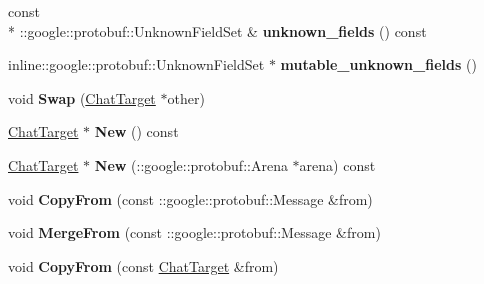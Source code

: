 \begin{DoxyCompactItemize}
\item 
\hypertarget{classSimpleChat_1_1ChatTarget_a8f89893fda6f9746dded787b9c65a7a5}{const \\*
\-::google\-::protobuf\-::\-Unknown\-Field\-Set \& {\bfseries unknown\-\_\-fields} () const }\label{classSimpleChat_1_1ChatTarget_a8f89893fda6f9746dded787b9c65a7a5}

\item 
\hypertarget{classSimpleChat_1_1ChatTarget_aab4226f6d671e5e4a008bd5e889aa322}{inline\-::google\-::protobuf\-::\-Unknown\-Field\-Set $\ast$ {\bfseries mutable\-\_\-unknown\-\_\-fields} ()}\label{classSimpleChat_1_1ChatTarget_aab4226f6d671e5e4a008bd5e889aa322}

\item 
\hypertarget{classSimpleChat_1_1ChatTarget_a94869595abb80310c9be52a3003bfac6}{void {\bfseries Swap} (\hyperlink{classSimpleChat_1_1ChatTarget}{Chat\-Target} $\ast$other)}\label{classSimpleChat_1_1ChatTarget_a94869595abb80310c9be52a3003bfac6}

\item 
\hypertarget{classSimpleChat_1_1ChatTarget_ad04e89f9a6180979b13d06ffdbcc6e33}{\hyperlink{classSimpleChat_1_1ChatTarget}{Chat\-Target} $\ast$ {\bfseries New} () const }\label{classSimpleChat_1_1ChatTarget_ad04e89f9a6180979b13d06ffdbcc6e33}

\item 
\hypertarget{classSimpleChat_1_1ChatTarget_ad83821f89032d4bd3ca0b9b75c12c8fb}{\hyperlink{classSimpleChat_1_1ChatTarget}{Chat\-Target} $\ast$ {\bfseries New} (\-::google\-::protobuf\-::\-Arena $\ast$arena) const }\label{classSimpleChat_1_1ChatTarget_ad83821f89032d4bd3ca0b9b75c12c8fb}

\item 
\hypertarget{classSimpleChat_1_1ChatTarget_a94d55ead775ccd548848efefc4e18509}{void {\bfseries Copy\-From} (const \-::google\-::protobuf\-::\-Message \&from)}\label{classSimpleChat_1_1ChatTarget_a94d55ead775ccd548848efefc4e18509}

\item 
\hypertarget{classSimpleChat_1_1ChatTarget_ac65c80b3519e88a89c1531c768f051d4}{void {\bfseries Merge\-From} (const \-::google\-::protobuf\-::\-Message \&from)}\label{classSimpleChat_1_1ChatTarget_ac65c80b3519e88a89c1531c768f051d4}

\item 
\hypertarget{classSimpleChat_1_1ChatTarget_a1852d72c18ee6ca3a6a6237ee6e6e49c}{void {\bfseries Copy\-From} (const \hyperlink{classSimpleChat_1_1ChatTarget}{Chat\-Target} \&from)}\label{classSimpleChat_1_1ChatTarget_a1852d72c18ee6ca3a6a6237ee6e6e49c}


\end{DoxyCompactItemize}
